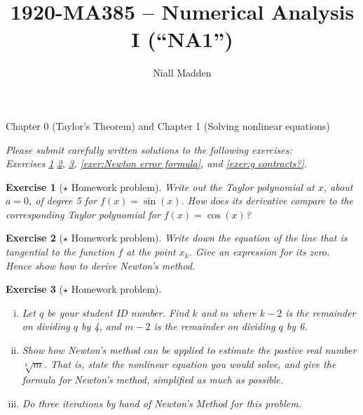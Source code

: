 \documentclass[a4paper, notitlepage,12pt]{report}
\author{Niall Madden}
\title{1920-MA385 -- Numerical Analysis I (``NA1'')}
\newtheorem{exercise}{Exercise}[chapter]
\newcommand{\ChapterTitle}{ ~ }
\begin{document}
\renewcommand{\ChapterTitle}{Solving nonlinear equations}
\setcounter{chapter}{0}
\begin{center}
{\Large Chapter 0 (Taylor's Theorem) and Chapter 1 (\ChapterTitle)}

\emph{\large Please submit carefully written solutions to the
  following exercises: \\
  Exercises
  \ref{exer:Taylor sin}
  \ref{exer:derive Newton},
  \ref{exer:newton converge},
  \ref{exer:Newton error formula},
  and
  \ref{exer:g contracts?}.
}

\end{center}


\setcounter{chapter}{0}
\setcounter{exercise}{1}
% 
\begin{exercise}[$\star$  Homework problem]
  \label{exer:Taylor sin}
  Write out the Taylor polynomial at  $x$, about $a=0$, of degree 5 for
  $f(x)=\sin(x)$. How does its derivative compare to the corresponding
  Taylor polynomial for $f(x)=\cos(x)$?
\end{exercise}

\setcounter{chapter}{1}
\setcounter{exercise}{0}
\setcounter{exercise}{7}
\begin{exercise}[$\star$ Homework problem] 
  \label{exer:derive Newton} 
Write down the equation of the line that is tangential to the
  function $f$ at the point $x_k$. Give an expression for its
  zero. Hence show how to derive Newton's method.
\end{exercise}

\setcounter{exercise}{9}
\begin{exercise}[$\star$ Homework problem]
  \label{exer:newton converge}
  \begin{enumerate}[(i)]
  \item Let $q$ be your student ID number.
    Find $k$ and $m$ where $k-2$ is the remainder on dividing $q$ by 4,
    and $m-2$ is the remainder on dividing $q$ by 6.
    
  \item Show how Newton's method can be applied to estimate the
    postive real number $\displaystyle \sqrt[k]{m}$.
    That is, state the nonlinear equation you would solve, and give
    the formula for Newton's method, simplified as much as  possible.
    
\item Do three iterations by hand of Newton's Method for this problem.
\end{enumerate}
\end{exercise}
\end{document}
